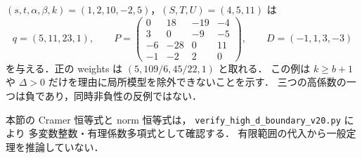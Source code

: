 \begin{example}[残る領域には正整数局所模型がある]
\label{hd20:remaining-example}
$(s,t,\alpha,\beta,k)=(1,2,10,-2,5)$，$(S,T,U)=(4,5,11)$ は
\[
 q=(5,11,23,1),\qquad
 P=\begin{pmatrix}
 0&18&-19&-4\\
 3&0&-9&-5\\
 -6&-28&0&11\\
 -1&-2&2&0
 \end{pmatrix},\qquad
 D=(-1,1,3,-3)
\]
を与える．正の weights は $(5,109/6,45/22,1)$ と取れる．
この例は $k\ge b+1$ や $\Delta>0$ だけを理由に局所模型を除外できないことを示す．
三つの高係数の一つは負であり，同時非負性の反例ではない．
\end{example}

本節の Cramer 恒等式と norm 恒等式は，
\texttt{verify\_high\_d\_boundary\_v20.py} により
多変数整数・有理係数多項式として確認する．
有限範囲の代入から一般定理を推論していない．
